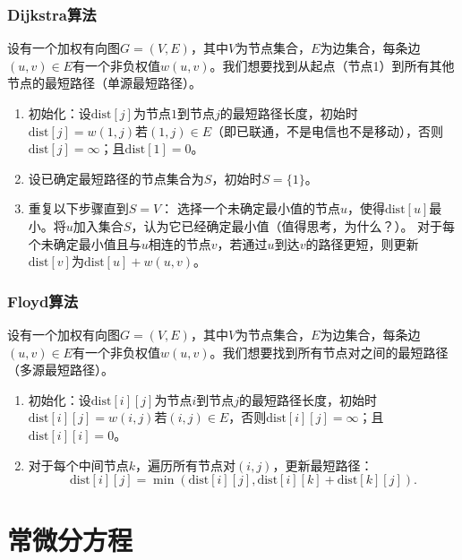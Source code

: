 \documentclass[a4paper, 12pt]{article}
\begin{document}
    \subsubsection{Dijkstra算法}

    设有一个加权有向图$G=(V,E)$，其中$V$为节点集合，$E$为边集合，每条边$(u,v)\in E$有一个非负权值$w(u,v)$。我们想要找到从起点（节点1）到所有其他节点的最短路径（单源最短路径）。

    \begin{enumerate}
        \item 初始化：设$\mathrm{dist}[j]$为节点$1$到节点$j$的最短路径长度，初始时$\mathrm{dist}[j]=w(1,j)$若$(1,j)\in E$（即已联通，不是电信也不是移动），否则$\mathrm{dist}[j]=\infty$；且$\mathrm{dist}[1]=0$。
        \item 设已确定最短路径的节点集合为$S$，初始时$S=\{1\}$。
        \item 重复以下步骤直到$S=V$：
        \subitem 选择一个未确定最小值的节点$u$，使得$\mathrm{dist}[u]$最小。将$u$加入集合$S$，认为它已经确定最小值（值得思考，为什么？）。
        \subitem 对于每个未确定最小值且与$u$相连的节点$v$，若通过$u$到达$v$的路径更短，则更新$\mathrm{dist}[v]$为$\mathrm{dist}[u] + w(u,v)$。
    \end{enumerate}

    \subsubsection{Floyd算法}

    设有一个加权有向图$G=(V,E)$，其中$V$为节点集合，$E$为边集合，每条边$(u,v)\in E$有一个非负权值$w(u,v)$。我们想要找到所有节点对之间的最短路径（多源最短路径）。

    \begin{enumerate}
        \item 初始化：设$\mathrm{dist}[i][j]$为节点$i$到节点$j$的最短路径长度，初始时$\mathrm{dist}[i][j]=w(i,j)$若$(i,j)\in E$，否则$\mathrm{dist}[i][j]=\infty$；且$\mathrm{dist}[i][i]=0$。
        \item 对于每个中间节点$k$，遍历所有节点对$(i,j)$，更新最短路径：
        \[
        \mathrm{dist}[i][j] = \min(\mathrm{dist}[i][j], \mathrm{dist}[i][k] + \mathrm{dist}[k][j]).
        \]
    \end{enumerate}

    \section{常微分方程}
\end{document}
